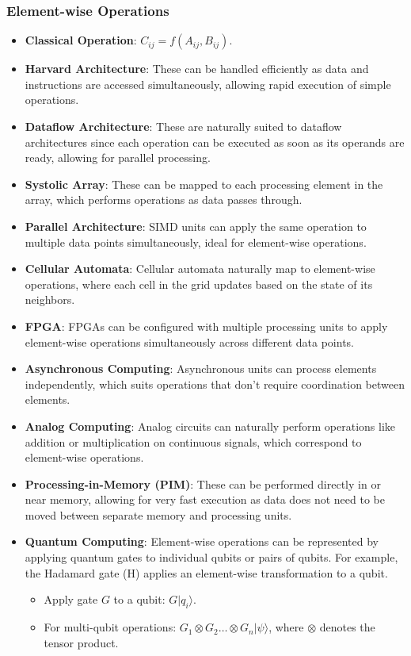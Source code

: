 \documentclass{article}
\begin{document}
\subsubsection{Element-wise Operations}
\begin{itemize}
    \item \textbf{Classical Operation}: \( C_{ij} = f(A_{ij}, B_{ij}) \). 
    \item \textbf{Harvard Architecture}: These can be handled efficiently as data and instructions are accessed simultaneously, allowing rapid execution of simple operations.
    \item \textbf{Dataflow Architecture}: These are naturally suited to dataflow architectures since each operation can be executed as soon as its operands are ready, allowing for parallel processing.
    \item \textbf{Systolic Array}: These can be mapped to each processing element in the array, which performs operations as data passes through.
    \item \textbf{Parallel Architecture}: SIMD units can apply the same operation to multiple data points simultaneously, ideal for element-wise operations.
    \item \textbf{Cellular Automata}: Cellular automata naturally map to element-wise operations, where each cell in the grid updates based on the state of its neighbors.
    \item \textbf{FPGA}: FPGAs can be configured with multiple processing units to apply element-wise operations simultaneously across different data points.
    \item \textbf{Asynchronous Computing}: Asynchronous units can process elements independently, which suits operations that don't require coordination between elements.
    \item \textbf{Analog Computing}: Analog circuits can naturally perform operations like addition or multiplication on continuous signals, which correspond to element-wise operations.
    \item \textbf{Processing-in-Memory (PIM)}: These can be performed directly in or near memory, allowing for very fast execution as data does not need to be moved between separate memory and processing units.
    \item \textbf{Quantum Computing}: Element-wise operations can be represented by applying quantum gates to individual qubits or pairs of qubits. For example, the Hadamard gate (H) applies an element-wise transformation to a qubit. 
    \begin{itemize}
        \item Apply gate \( G \) to a qubit: \( G|q_i\rangle \). 
        \item For multi-qubit operations: \( G_1 \otimes G_2 \dots \otimes G_n |\psi\rangle \), where \( \otimes \) denotes the tensor product.
    \end{itemize}
\end{itemize}
\end{document}
